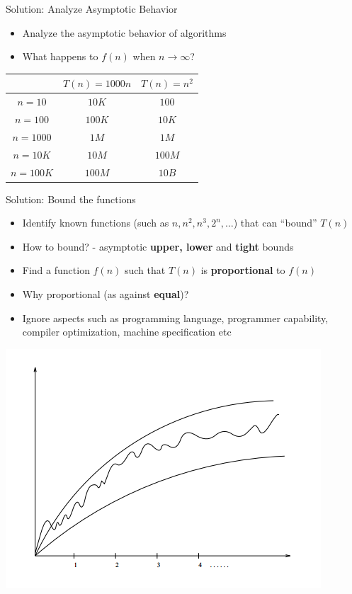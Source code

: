 \documentclass{beamer}
\begin{document}
\begin{frame}{Solution: Analyze Asymptotic Behavior}
\begin{itemize}
\item Analyze the asymptotic behavior of algorithms
\item What happens to $f(n)$ when $n \to \infty$?
\end{itemize}
\begin{center}
\begin{table}[h]
\begin{tabular}{|c|c|c|}
\hline
       & $T(n)=1000n$ & $T(n)=n^2$       \\ \hline
$n=10$   & $10K$          & $100$        \\ \hline
$n=100$  & $100K$         & $10K$        \\ \hline
$n=1000$ & $1M$           & $1M$         \\ \hline
$n=10K$  & $10M$          & $100M$       \\ \hline
$n=100K$  & $100M$          & $10B$       \\ \hline
\end{tabular}
\end{table}
\end{center}
\end{frame}

\begin{frame}{Solution: Bound the functions}
\begin{itemize}
\item Identify known functions (such as $n, n^2, n^3, 2^n, \ldots$) that can ``bound'' $T(n)$
\item How to bound? - asymptotic {\bf upper, lower} and {\bf tight} bounds
\item Find a function $f(n)$ such that $T(n)$ is {\bf proportional} to $f(n)$
\item Why proportional (as against {\bf equal})?
\item Ignore aspects such as programming language, programmer capability, compiler optimization, machine specification etc
\end{itemize}
\begin{center}
    \includegraphics[scale=0.4]{realWorldFunctions.png}
\end{center}
\end{frame}
\end{document}
